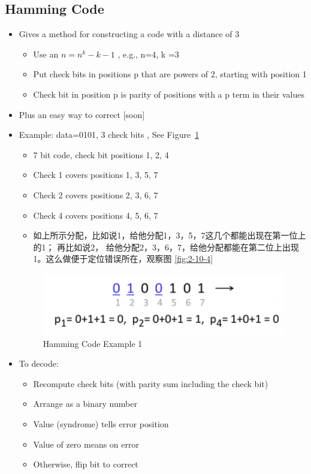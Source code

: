 \documentclass[12pt]{ctexart}   %
\begin{document}
	\subsection{Hamming Code }
	\begin{itemize}
		\item Gives a method for constructing a code with a distance of 3
		\begin{itemize}
			\item Use an $n = n^k - k -1$ , e.g., n=4, k =3
			\item Put check bits in positions p that are powers of 2, starting with position 1
			\item Check bit in position p is parity of positions with a p term in their values
		\end{itemize}
		
		\item Plus an easy way to correct [soon]
		
		\item Example: data=0101, 3 check bits , See Figure~\ref{fig:2-10-2}
		\begin{itemize}
			\item 7 bit code, check bit positions 1, 2, 4 
			\item Check 1 covers positions 1, 3, 5, 7
			\item Check 2 covers positions 2, 3, 6, 7
			\item Check 4 covers positions 4, 5, 6, 7
			\item 如上所示分配，比如说1，给他分配1，3，5，7这几个都能出现在第一位上的1； 再比如说2， 给他分配2，3，6，7，给他分配都能在第二位上出现1。这么做便于定位错误所在，观察图 \ref{fig:2-10-4}
		\end{itemize}
		
		\begin{figure}[h!] %
		\centering
		 \includegraphics[scale=0.7]{images/2-10-2}
		\caption{Hamming Code Example 1}
		 \label{fig:2-10-2}
		 \end{figure}
		 
		 \item To decode:
		 \begin{itemize}
		 	\item Recompute check bits (with parity sum including the check bit)
		 	\item Arrange as a binary number
		 	\item Value (syndrome) tells error position
		 	\item Value of zero means on error
		 	\item Otherwise, flip bit to correct
		 \end{itemize}
		 

\end{itemize}
\end{document}
